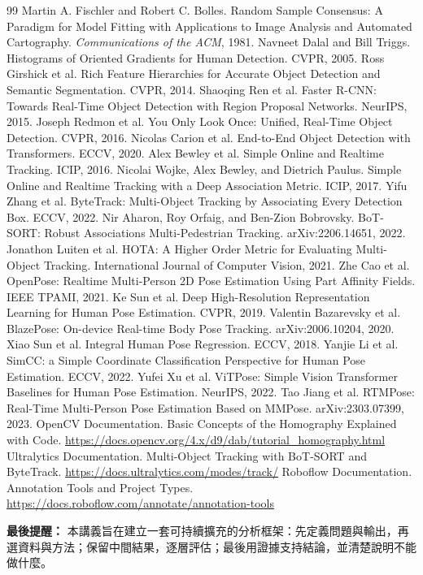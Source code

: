 \documentclass[11pt,a4paper,oneside]{report}
\renewcommand{\bibname}{參考資料}
\begin{document}
\renewcommand{\bibname}{參考資料與進一步閱讀}
\small
\begin{thebibliography}{99}
 Martin A. Fischler and Robert C. Bolles. Random Sample Consensus: A Paradigm for Model Fitting with Applications to Image Analysis and Automated Cartography. \textit{Communications of the ACM}, 1981.
 Navneet Dalal and Bill Triggs. Histograms of Oriented Gradients for Human Detection. CVPR, 2005.
 Ross Girshick et al. Rich Feature Hierarchies for Accurate Object Detection and Semantic Segmentation. CVPR, 2014.
 Shaoqing Ren et al. Faster R-CNN: Towards Real-Time Object Detection with Region Proposal Networks. NeurIPS, 2015.
 Joseph Redmon et al. You Only Look Once: Unified, Real-Time Object Detection. CVPR, 2016.
 Nicolas Carion et al. End-to-End Object Detection with Transformers. ECCV, 2020.
 Alex Bewley et al. Simple Online and Realtime Tracking. ICIP, 2016.
 Nicolai Wojke, Alex Bewley, and Dietrich Paulus. Simple Online and Realtime Tracking with a Deep Association Metric. ICIP, 2017.
 Yifu Zhang et al. ByteTrack: Multi-Object Tracking by Associating Every Detection Box. ECCV, 2022.
 Nir Aharon, Roy Orfaig, and Ben-Zion Bobrovsky. BoT-SORT: Robust Associations Multi-Pedestrian Tracking. arXiv:2206.14651, 2022.
 Jonathon Luiten et al. HOTA: A Higher Order Metric for Evaluating Multi-Object Tracking. International Journal of Computer Vision, 2021.
 Zhe Cao et al. OpenPose: Realtime Multi-Person 2D Pose Estimation Using Part Affinity Fields. IEEE TPAMI, 2021.
 Ke Sun et al. Deep High-Resolution Representation Learning for Human Pose Estimation. CVPR, 2019.
 Valentin Bazarevsky et al. BlazePose: On-device Real-time Body Pose Tracking. arXiv:2006.10204, 2020.
 Xiao Sun et al. Integral Human Pose Regression. ECCV, 2018.
 Yanjie Li et al. SimCC: a Simple Coordinate Classification Perspective for Human Pose Estimation. ECCV, 2022.
 Yufei Xu et al. ViTPose: Simple Vision Transformer Baselines for Human Pose Estimation. NeurIPS, 2022.
 Tao Jiang et al. RTMPose: Real-Time Multi-Person Pose Estimation Based on MMPose. arXiv:2303.07399, 2023.
 OpenCV Documentation. Basic Concepts of the Homography Explained with Code. \url{https://docs.opencv.org/4.x/d9/dab/tutorial_homography.html}
 Ultralytics Documentation. Multi-Object Tracking with BoT-SORT and ByteTrack. \url{https://docs.ultralytics.com/modes/track/}
 Roboflow Documentation. Annotation Tools and Project Types. \url{https://docs.roboflow.com/annotate/annotation-tools}
\end{thebibliography}
\normalsize

\begin{heroBox}
\textbf{最後提醒：}\quad
本講義旨在建立一套可持續擴充的分析框架：先定義問題與輸出，再選資料與方法；保留中間結果，逐層評估；最後用證據支持結論，並清楚說明不能做什麼。
\end{heroBox}
\end{document}
